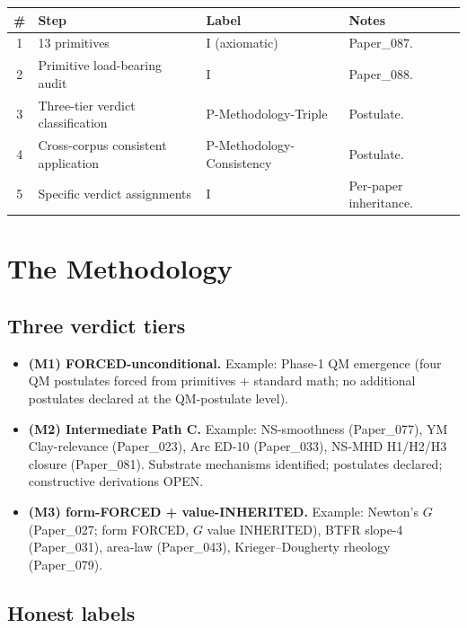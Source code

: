 \documentclass[11pt,a4paper]{article}
\begin{document}
\begin{center}
\begin{tabular}{cllp{}}
\toprule
\textbf{\#} & \textbf{Step} & \textbf{Label} & \textbf{Notes} \\
\midrule
1 & 13 primitives & I (axiomatic) & Paper\_087. \\
2 & Primitive load-bearing audit & I & Paper\_088. \\
3 & Three-tier verdict classification & P-Methodology-Triple & Postulate. \\
4 & Cross-corpus consistent application & P-Methodology-Consistency & Postulate. \\
5 & Specific verdict assignments & I & Per-paper inheritance. \\
\bottomrule
\end{tabular}
\end{center}

\section{The Methodology}

\subsection{Three verdict tiers}

\begin{itemize}[noitemsep]
\item \textbf{(M1) FORCED-unconditional.} Example: Phase-1 QM emergence (four QM postulates forced from primitives + standard math; no additional postulates declared at the QM-postulate level).
\item \textbf{(M2) Intermediate Path C.} Example: NS-smoothness (Paper\_077), YM Clay-relevance (Paper\_023), Arc ED-10 (Paper\_033), NS-MHD H1/H2/H3 closure (Paper\_081). Substrate mechanisms identified; postulates declared; constructive derivations OPEN.
\item \textbf{(M3) form-FORCED + value-INHERITED.} Example: Newton's $G$ (Paper\_027; form FORCED, $G$ value INHERITED), BTFR slope-4 (Paper\_031), area-law (Paper\_043), Krieger--Dougherty rheology (Paper\_079).
\end{itemize}

\subsection{Honest labels}
\end{document}
